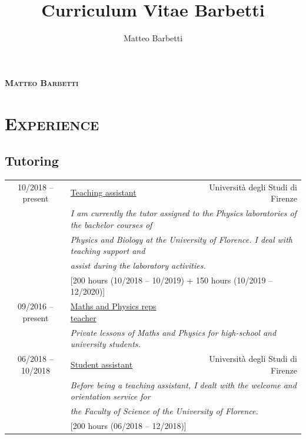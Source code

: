 \documentclass[a4paper, 11pt, notitlepage]{article}
\author{Matteo Barbetti}
\title{Curriculum Vitae Barbetti}
\begin{document}

\begin{center}
    \textbf {\LARGE \textsc{Matteo Barbetti}}
\end{center}

\vskip 12mm

\section*{\textsc{Experience}}

\subsection*{Tutoring}
\begin{tabular}{clr}
    {\small 10/2018 -- present} & \ul{Teaching assistant} & {\small Università degli Studi di Firenze}\\
    & \multicolumn{2}{l}{\small \emph {I am currently the tutor assigned to the Physics laboratories of the bachelor courses of}}\\
    & \multicolumn{2}{l}{\small \emph {Physics and Biology at the University of Florence. I deal with teaching support and}}\\
    & \multicolumn{2}{l}{\small \emph {assist during the laboratory activities.}}\\
    & \multicolumn{2}{l}{\small [200 hours (10/2018 -- 10/2019) + 150 hours (10/2019 -- 12/2020)]}\\ [3 mm]
    
    {\small 09/2016 -- present} & \ul{Maths and Physics reps teacher}\\
    & \multicolumn{2}{l}{\small \emph {Private lessons of Maths and Physics for high-school and university students.}}\\ [3 mm]
            
    {\small 06/2018 -- 10/2018} & \ul{Student assistant} & {\small Università degli Studi di Firenze}\\
    & \multicolumn{2}{l}{\small \emph {Before being a teaching assistant, I dealt with the welcome and orientation service for}}\\
    & \multicolumn{2}{l}{\small \emph {the Faculty of Science of the University of Florence.}}\\
    & \multicolumn{2}{l}{\small [200 hours (06/2018 -- 12/2018)]}\\
\end{tabular}
\end{document}
